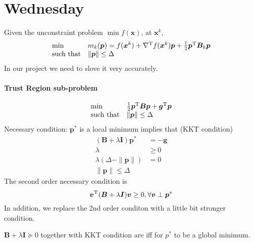 
\section{Wednesday}
Given the unconstraint problem $\min f(\bm x)$, at $\bm x^k$,
\[
\begin{array}{ll}
\min&m_k(\bm p)=f(\bm x^k)+\nabla^{\mathrm T} f(\bm x^k)\bm p+\frac{1}{2}\bm p^{\mathrm T}\bm B_k\bm p\\
\mbox{such that}&\|\bm p\|\le\Delta
\end{array}
\]
In our project we need to slove it very accurately.
\paragraph{Trust Region sub-problem}
\[
\begin{array}{ll}
\min&\frac{1}{2}\bm p^{\mathrm T}\bm B\bm p+\bm g^{\mathrm T}\bm p\\
\mbox{such that}&\|\bm p\|\le\Delta
\end{array}
\]
Necessary condition: $\bm p^*$ is a local minimum implies that (KKT condition)
\begin{subequations}
\begin{align}
(\bm B+\lambda\bm I)\bm p^*&=-\bm g\label{Eq:12:8:a}\\
\lambda&\ge0\\
\lambda(\Delta - \|\bm p\|)&=0\\
\|\bm p\|\le\Delta
\end{align}
\end{subequations}
The second order necessary condition is
\[
\bm v^{\mathrm T}(\bm B+\lambda\bm I)\bm v\ge0,\forall \bm v\perp\bm p^*
\]
In addition, we replace the 2nd order conditon with a little bit stronger condition. 
\begin{proposition}
$\bm B+\lambda\bm I\succeq0$ together with KKT condition are iff for $p^*$ to be a global minimum.
\end{proposition}
